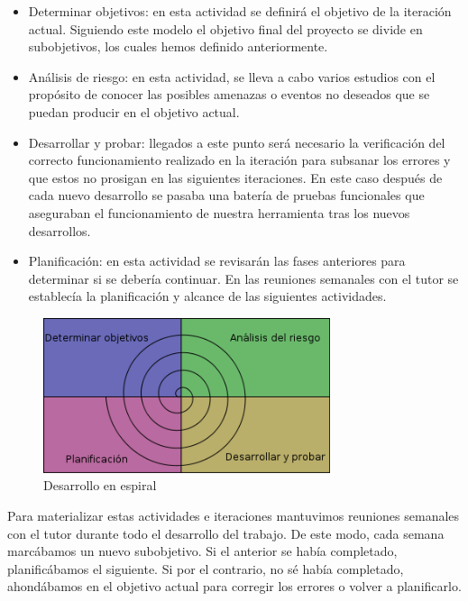 \begin{itemize}
\item Determinar objetivos: en esta actividad se definirá el objetivo de la iteración actual. Siguiendo este modelo el objetivo final del proyecto se divide en subobjetivos, los cuales hemos definido anteriormente.
\item Análisis de riesgo: en esta actividad, se lleva a cabo varios estudios con el propósito de conocer las posibles amenazas o eventos no deseados que se puedan producir en el objetivo actual.
\item Desarrollar y probar: llegados a este punto será necesario la verificación del correcto funcionamiento realizado en la iteración para subsanar los errores y que estos no prosigan en las siguientes iteraciones. En este caso después de cada nuevo desarrollo se pasaba una batería de pruebas funcionales que aseguraban el funcionamiento de nuestra herramienta tras los nuevos desarrollos.
\item Planificación: en esta actividad se revisarán las fases anteriores para determinar si se debería continuar. En las reuniones semanales con el tutor se establecía la planificación y alcance de las siguientes actividades.
\end{itemize}

\begin{figure}[h]
    \centering
    \includegraphics[width=0.75\textwidth]{img/metodologia_espiral}
    \caption{Desarrollo en espiral}
    \label{fig:espira}
\end{figure}

Para materializar estas actividades e iteraciones mantuvimos reuniones semanales con el tutor durante todo el desarrollo del trabajo. De este modo, cada semana marcábamos un nuevo subobjetivo. Si el anterior se había completado, planificábamos el siguiente. Si por el contrario, no sé había completado, ahondábamos en el objetivo actual para corregir los errores o volver a planificarlo.\\


